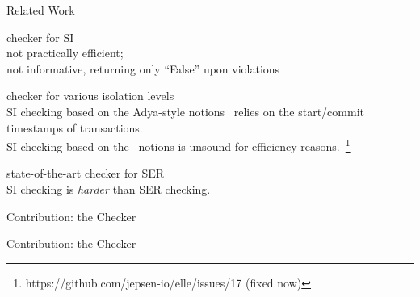 \begin{frame}{Related Work}
  \begin{description}
    \setlength{\itemsep}{15pt}
    \item[dbcop~\ncite{Complexity:OOPSLA2019}] checker for SI \\[2pt]
      not practically efficient; \\[2pt]
      not informative, returning only ``\textsf{False}'' upon violations
    \pause
    \item[Elle~\ncite{Elle:VLDB2020}] checker for various isolation levels \\[2pt]
      \pause
      SI checking based on the Adya-style notions~
      relies on the start/commit timestamps of transactions.\\[2pt]
      \pause
      SI checking based on the~ notions
      is unsound for efficiency reasons.~\footnote{https://github.com/jepsen-io/elle/issues/17 (fixed now)}
    \pause
    \item[Cobra~\ncite{Cobra:OSDI2020}] state-of-the-art checker for SER \\[2pt]
      SI checking is {\it harder} than SER checking.
  \end{description}
\end{frame}

\begin{frame}{Contribution: the \polysi{} Checker}
\end{frame}

\begin{frame}{Contribution: the \polysi{} Checker}
  \begin{center}
    

    \vspace{0.50cm}
  \end{center}
\end{frame}
